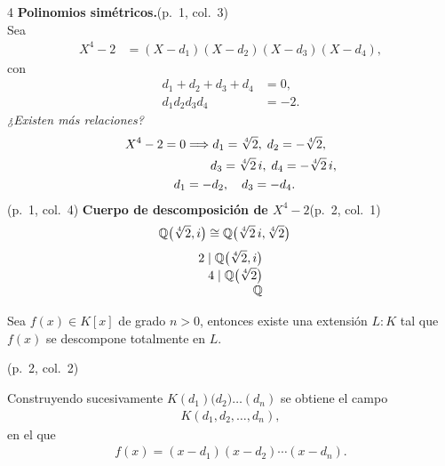 \documentclass[landscape,a4paper]{article}
\begin{document}
\begin{multicols}{4}
\noindent\textbf{Polinomios simétricos.}\hfill(p.~1, col.~3)\\
Sea
\begin{align*}
X^{4}-2&=(X-d_{1})(X-d_{2})(X-d_{3})(X-d_{4}),
\end{align*}
con
\begin{align*}
d_{1}+d_{2}+d_{3}+d_{4}&=0,\\
d_{1}d_{2}d_{3}d_{4}&=-2.
\end{align*}
\textit{¿Existen más relaciones?}
\begin{align*}
X^{4}-2=0 &\Longrightarrow 
d_{1}= \root 4 \of 2,\;
d_{2}= -\root 4 \of 2,\\
&\qquad d_{3}= \root 4 \of 2\,i,\;
d_{4}= -\root 4 \of 2\,i,\\
d_{1}&=-d_{2},\quad d_{3}=-d_{4}.
\end{align*}
(p.~1, col.~4)
\noindent\textbf{Cuerpo de descomposición de $X^{4}-2$}\hfill(p.~2, col.~1)\\[-0.3em]
\begin{align*}
\mathbb{Q}\bigl(\root 4 \of 2,i\bigr) 
&\cong \mathbb{Q}\bigl(\root 4 \of 2\,i,\root 4 \of 2\bigr)
\end{align*}
\vspace{-0.2em}
\begin{align*}
2\;|\;\mathbb{Q}\bigl(\root 4 \of 2,i\bigr)\\[-0.3em]
4\;|\;\mathbb{Q}\bigl(\root 4 \of 2\bigr)\\[-0.3em]
\mathbb{Q}
\end{align*}

\begin{tcolorbox}[title={Proposición},colback=white,
                 colframe=brown!80!black,colbacktitle=brown!80!black,coltitle=white]
Sea $f(x)\in K[x]$ de grado $n>0$, entonces existe una extensión $L:K$ tal que $f(x)$ se descompone totalmente en $L$.
\end{tcolorbox}\hfill(p.~2, col.~2)

Construyendo sucesivamente $K(d_1)\bigl(d_2\bigr)\dots(d_n)$ se obtiene el campo
\begin{align*}
K(d_{1},d_{2},\dots,d_{n}),
\end{align*}
en el que
\begin{align*}
f(x)=(x-d_{1})(x-d_{2})\cdots(x-d_{n}).
\end{align*}


\end{multicols}
\end{document}
